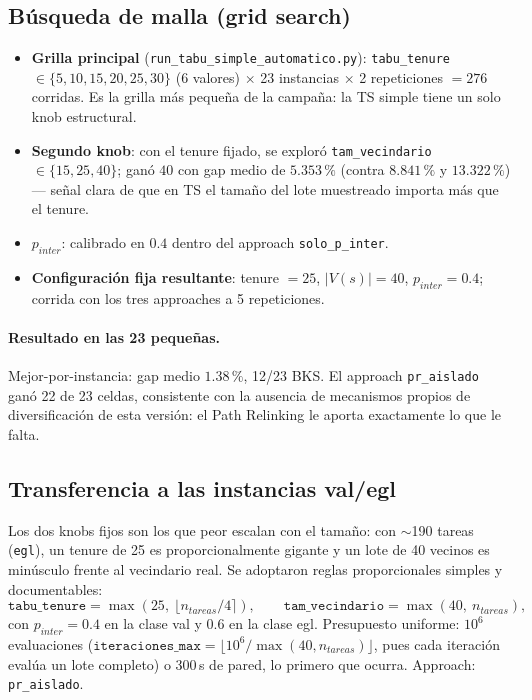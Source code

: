 \subsection{Búsqueda de malla (grid search)}
\begin{itemize}
  \item \textbf{Grilla principal} (\texttt{run\_tabu\_simple\_automatico.py}):
    \texttt{tabu\_tenure} $\in \{5, 10, 15, 20, 25, 30\}$ (6 valores)
    $\times$ 23 instancias $\times$ 2 repeticiones $= 276$ corridas. Es la
    grilla más pequeña de la campaña: la TS simple tiene un solo knob
    estructural.
  \item \textbf{Segundo knob}: con el tenure fijado, se exploró
    \texttt{tam\_vecindario} $\in \{15, 25, 40\}$; ganó $40$ con gap medio de
    $5.353\,\%$ (contra $8.841\,\%$ y $13.322\,\%$) --- señal clara de que en
    TS el tamaño del lote muestreado importa más que el tenure.
  \item \textbf{$p_{inter}$}: calibrado en $0.4$ dentro del approach
    \texttt{solo\_p\_inter}.
  \item \textbf{Configuración fija resultante}: tenure $= 25$, $|V(s)| = 40$,
    $p_{inter} = 0.4$; corrida con los tres approaches a 5 repeticiones.
\end{itemize}

\paragraph{Resultado en las 23 pequeñas.} Mejor-por-instancia: gap medio
$1.38\,\%$, 12/23 BKS. El approach \texttt{pr\_aislado} ganó 22 de 23 celdas,
consistente con la ausencia de mecanismos propios de diversificación de esta
versión: el Path Relinking le aporta exactamente lo que le falta.

\subsection{Transferencia a las instancias val/egl}
Los dos knobs fijos son los que peor escalan con el tamaño: con $\sim$190
tareas (\texttt{egl}), un tenure de 25 es proporcionalmente gigante y un lote
de 40 vecinos es minúsculo frente al vecindario real. Se adoptaron reglas
proporcionales simples y documentables:
\[
  \texttt{tabu\_tenure} = \max(25,\ \lfloor n_{tareas}/4 \rceil), \qquad
  \texttt{tam\_vecindario} = \max(40,\ n_{tareas}),
\]
con $p_{inter} = 0.4$ en la clase val y $0.6$ en la clase egl. Presupuesto
uniforme: $10^6$ evaluaciones ($\texttt{iteraciones\_max} = \lfloor 10^6 /
\max(40, n_{tareas}) \rfloor$, pues cada iteración evalúa un lote completo) o
300\,s de pared, lo primero que ocurra. Approach: \texttt{pr\_aislado}.
